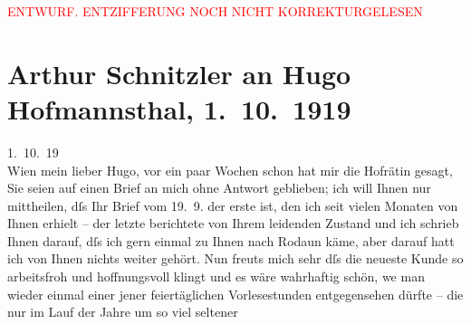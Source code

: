 
\begin{center}
            \textcolor{red}{ENTWURF. ENTZIFFERUNG NOCH NICHT KORREKTURGELESEN}
                      \end{center}
            
               \section[Arthur Schnitzler an Hugo Hofmannsthal, 1. 10. 1919]{ Arthur Schnitzler an Hugo Hofmannsthal, 1. 10. 1919}\nopagebreak{}\rehead{ }\begin{ledgroupsized}[t]{13cm}\normalsize\beginnumbering{} \toendnotes[C]{\smallbreak\pagebreak[2]} 
\toendnotes[C]{\smallbreak}\pstart
           \raggedleft{}{\pb}1. 10. 19{\\}Wien\pend
           \pstart
           mein lieber Hugo, vor ein paar Wochen schon hat mir die Hofrätin gesagt, Sie seien auf einen Brief an mich
               ohne Antwort geblieben; ich will Ihnen nur mittheilen, dſs Ihr Brief vom
                  19. 9. der erste ist, den ich seit vielen Monaten von Ihnen erhielt –
               der letzte berichtete von Ihrem leidenden Zustand und ich schrieb Ihnen darauf, dſs
               ich gern einmal zu Ihnen nach Rodaun käme, aber
               darauf hatt ich von Ihnen nichts weiter gehört. Nun freuts mich sehr dſs die neueste
               Kunde so arbeitsfroh und hoffnungsvoll klingt und es wäre wahrhaftig schön, we{\geminationn} man wieder einmal einer jener feiertäglichen
               Vorlesestunden entgegensehen dürfte – die nur im Lauf der Jahre um so viel seltener

\end{ledgroupsized}
